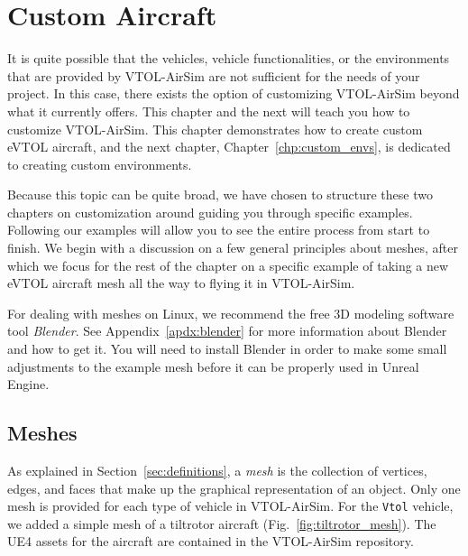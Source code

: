 
\chapter{Custom Aircraft}\label{chp:custom_aircraft}

It is quite possible that the vehicles, vehicle functionalities, or the environments that are provided by VTOL-AirSim are not sufficient for the needs of your project. In this case, there exists the option of customizing VTOL-AirSim beyond what it currently offers. This chapter and the next will teach you how to customize VTOL-AirSim. This chapter demonstrates how to create custom eVTOL aircraft, and the next chapter, Chapter~\ref{chp:custom_envs}, is dedicated to creating custom environments.

Because this topic can be quite broad, we have chosen to structure these two chapters on customization around guiding you through specific examples. Following our examples will allow you to see the entire process from start to finish. We begin with a discussion on a few general principles about meshes, after which we focus for the rest of the chapter on a specific example of taking a new eVTOL aircraft mesh all the way to flying it in VTOL-AirSim.

For dealing with meshes on Linux, we recommend the free 3D modeling software tool \textit{Blender}. See Appendix~\ref{apdx:blender} for more information about Blender and how to get it. You will need to install Blender in order to make some small adjustments to the example mesh before it can be properly used in Unreal Engine.

\section{Meshes}\label{sec:meshes}
As explained in Section~\ref{sec:definitions}, a \textit{mesh} is the collection of vertices, edges, and faces that make up the graphical representation of an object. Only one mesh is provided for each type of vehicle in VTOL-AirSim. For the \verb|Vtol| vehicle, we added a simple mesh of a tiltrotor aircraft (Fig.~\ref{fig:tiltrotor_mesh}). The UE4 assets for the aircraft are contained in the VTOL-AirSim repository.

